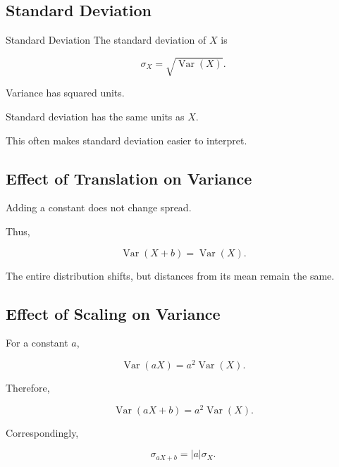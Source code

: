 \subsection{Standard Deviation}
\label{subsec:standard-deviation}

\begin{definitionbox}{Standard Deviation}
The standard deviation of \(X\) is

\[
\boxed{
\sigma_X
=
\sqrt{
\operatorname{Var}(X)
}.
}
\]
\end{definitionbox}

Variance has squared units.

Standard deviation has the same units as \(X\).

This often makes standard deviation easier to interpret.

\subsection{Effect of Translation on Variance}
\label{subsec:translation-variance}

Adding a constant does not change spread.

Thus,

\[
\boxed{
\operatorname{Var}(X+b)
=
\operatorname{Var}(X).
}
\]

The entire distribution shifts, but distances from its mean remain the
same.

\subsection{Effect of Scaling on Variance}
\label{subsec:scaling-variance}

For a constant \(a\),

\[
\boxed{
\operatorname{Var}(aX)
=
a^2\operatorname{Var}(X).
}
\]

Therefore,

\[
\boxed{
\operatorname{Var}(aX+b)
=
a^2\operatorname{Var}(X).
}
\]

Correspondingly,

\[
\boxed{
\sigma_{aX+b}
=
|a|\sigma_X.
}
\]

